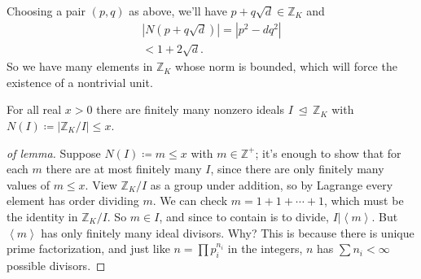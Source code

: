 \begin{remark}

Choosing a pair \((p, q)\) as above, we'll have
\(p + q \sqrt{d} \in {\mathbb{Z}}_K\) and
\begin{align*}
{\left\lvert { N( p + q \sqrt{d} ) } \right\rvert} 
= {\left\lvert { p^2 - d q^2 } \right\rvert} \\
< 1 + 2 \sqrt{d} 
.\end{align*}
So we have many elements in \({\mathbb{Z}}_K\) whose norm is bounded,
which will force the existence of a nontrivial unit.

\end{remark}

\begin{lemma}

For all real \(x> 0\) there are finitely many nonzero ideals
\(I{~\trianglelefteq~}{\mathbb{Z}}_K\) with
\(N(I) \coloneqq{\left\lvert { {\mathbb{Z}}_K/I } \right\rvert} \leq x\).

\end{lemma}

\begin{proof}[of lemma]

Suppose \(N(I) \coloneqq m \leq x\) with \(m \in {\mathbb{Z}}^+\); it's
enough to show that for each \(m\) there are at most finitely many
\(I\), since there are only finitely many values of \(m \leq x\). View
\({\mathbb{Z}}_K / I\) as a group under addition, so by Lagrange every
element has order dividing \(m\). We can check
\(m = 1 + 1 + \cdots + 1\), which must be the identity in
\({\mathbb{Z}}_K/I\). So \(m\in I\), and since to contain is to divide,
\(I \mathrel{\Big|}\left\langle{ m }\right\rangle\). But
\(\left\langle{ m }\right\rangle\) has only finitely many ideal
divisors. Why? This is because there is unique prime factorization, and
just like \(n = \prod p_i^{n_i}\) in the integers, \(n\) has
\(\sum n_i < \infty\) possible divisors.

\end{proof}

